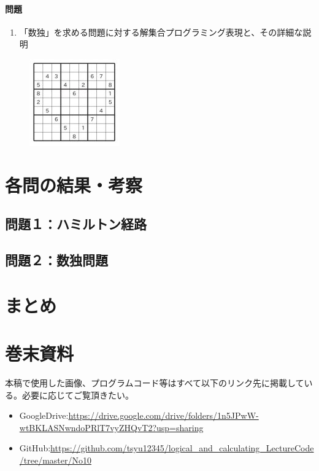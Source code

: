 \documentclass[dvipdfmx]{jsarticle}
\begin{document}
\paragraph{問題}
\begin{enumerate}
  \item 「数独」を求める問題に対する解集合プログラミング表現と、その詳細な説明
\end{enumerate}
\begin{figure}[H]
  \centering
  \includegraphics[scale=1.2]{images/sudoku.JPG}
\end{figure}

\section{各問の結果・考察}
\subsection{問題１：ハミルトン経路}
\subsection{問題２：数独問題}

\section{まとめ}
\section{巻末資料}
本稿で使用した画像、プログラムコード等はすべて以下のリンク先に掲載している。必要に応じてご覧頂きたい。
\begin{itemize}
  \item GoogleDrive:\url{https://drive.google.com/drive/folders/1n5JPwW-wtBKLASNwndoPRlT7vyZHQvT2?usp=sharing}
  \item GitHub:\url{https://github.com/tsyu12345/logical_and_calculating_LectureCode/tree/master/No10}
\end{itemize}
\end{document}
